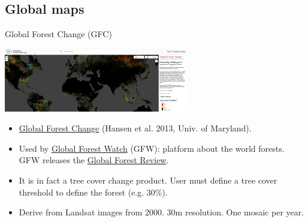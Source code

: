 \documentclass[10pt,table,dvipsnames,compress]{beamer}
\begin{document}
\subsection{Global maps}
\label{sec:orgfa24c16}

\begin{frame}[label={sec:org696133c}]{Global Forest Change (GFC)}
\begin{center}
\includegraphics[width=8cm]{figs/fcc/gfc.png}
\end{center}

\begin{itemize}
\item \href{https://glad.earthengine.app/view/global-forest-change}{Global Forest Change} (Hansen et al. 2013, Univ. of Maryland).
\item Used by \href{https://www.globalforestwatch.org/}{Global Forest Watch} (GFW): platform about the world forests. GFW releases the \href{https://research.wri.org/gfr/global-forest-review}{Global Forest Review}.
\item It is in fact a tree cover change product. User must define a tree cover threshold to define the forest (e.g. 30\%).
\item Derive from Landsat images from 2000. 30m resolution. One mosaic per year.
\end{itemize}
\end{frame}
\end{document}
